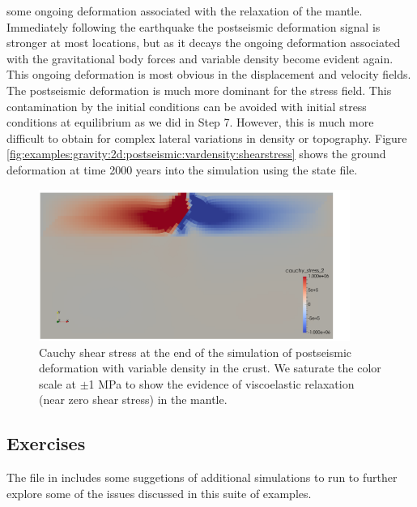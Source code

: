 some ongoing deformation associated with the relaxation of the mantle.
Immediately following the earthquake the postseismic deformation signal
is stronger at most locations, but as it decays the ongoing deformation
associated with the gravitational body forces and variable density
become evident again. This ongoing deformation is most obvious in
the displacement and velocity fields. The postseismic deformation
is much more dominant for the stress field. This contamination by
the initial conditions can be avoided with initial stress conditions
at equilibrium as we did in Step 7. However, this is much more difficult
to obtain for complex lateral variations in density or topography.
Figure \vref{fig:examples:gravity:2d:postseismic:vardensity:shearstress}
shows the ground deformation at time 2000 years into the simulation
using the state file. 

\begin{figure}
  \includegraphics[width=4in]{examples/figs/grav2d_postseismic_vardensity-shearstress}
  \caption{Cauchy shear stress at the end of the simulation of postseismic deformation
    with variable density in the crust. We saturate the color scale at
    $\pm$1 MPa to show the evidence of viscoelastic relaxation (near
    zero shear stress) in the mantle.}
  \label{fig:examples:gravity:2d:postseismic:vardensity:shearstress}
\end{figure}

\subsection{Exercises}

The  file in  includes
some suggetions of additional simulations to run to further explore
some of the issues discussed in this suite of examples.

